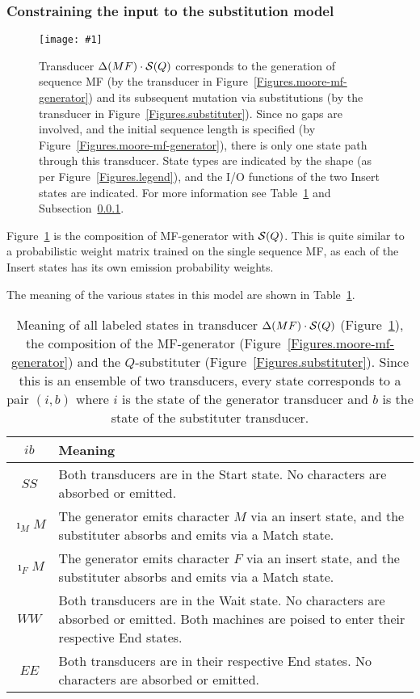 \documentclass{article}
\newcommand{\secref}[1]{Subsection~\ref{sec.#1}}
\newcommand{\seclabel}[1]{\label{sec.#1}}
\newcommand{\tabnum}[1]{\ref{tab.#1}}
\newcommand{\tabref}[1]{Table~\tabnum{#1}}
\newcommand{\tablabel}[1]{\label{tab.#1}}
\newcommand{\figref}[1]{Figure~\ref{Figures.#1}}
\newcommand{\figlabel}[1]{\label{Figures.#1}}
\newcommand{\easyfig}[4]{
\begin{figure}
\texttt{[image: \#1]}
\caption{ \figlabel{#3} #4}
\end{figure}}
\newcommand{\pdffig}[2]{\easyfig{#1-fig.pdf}{}{#1}{#2}}
\newcommand\substitute{{\cal S}}
\newcommand\generate{\Delta}
\begin{document}
\subsubsection{Constraining the input to the substitution model}
\seclabel{mf-substituter}
\pdffig{mf-substituter}{Transducer $\generate(MF) \cdot \substitute(Q)$
corresponds to the generation of sequence MF (by the transducer in \figref{moore-mf-generator})
and its subsequent mutation via substitutions (by the transducer in \figref{substituter}).
Since no gaps are involved, and the initial sequence length is specified (by \figref{moore-mf-generator}),
there is only one state path through this transducer.
State types are indicated by the shape (as per \figref{legend}), and the I/O functions of the two Insert states are indicated.
For more information see \tabref{mf-substituter} and \secref{mf-substituter}.
}

\figref{mf-substituter} is the composition of MF-generator with $\substitute(Q)$.  
This is quite similar to a probabilistic weight matrix trained on the single sequence MF,
as each of the Insert states has its own emission probability weights.

The meaning of the various states in this model are shown in \tabref{mf-substituter}.

\begin{table}
\begin{tabular}{c|p{}}
$i b$ & Meaning \\
\hline
$SS$ & Both transducers are in the Start state.  No characters are  absorbed or emitted. \\
$\imath_MM$ & The generator emits character $M$ via an insert state, and the substituter absorbs and emits via a Match state. \\
$\imath_FM$ & The generator emits character $F$ via an insert state, and the substituter absorbs and emits via a Match state. \\
$WW$ & Both transducers are in the Wait state.  No characters are  absorbed or emitted. Both machines are poised to enter their respective End states. \\
$EE$ & Both transducers are in their respective End states. No characters are  absorbed or emitted. \\
\end{tabular}
\caption{ \tablabel{mf-substituter} Meaning of all labeled states in
transducer $\generate(MF) \cdot \substitute(Q)$ (\figref{mf-substituter}),
the composition of the MF-generator (\figref{moore-mf-generator})
and the $Q$-substituter (\figref{substituter}).
Since this is an ensemble of two transducers, every state corresponds to a pair $(i,b)$
where
$i$ is the state of the generator transducer and
$b$ is the state of the substituter transducer.
 }
\end{table}
\end{document}
